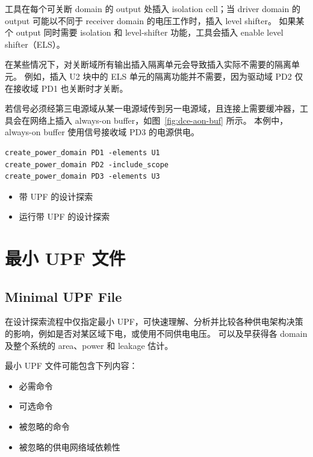 工具在每个可关断 domain 的 output 处插入 isolation cell；当 driver domain 的 output 可能以不同于 receiver domain 的电压工作时，插入 level shifter。
如果某个 output 同时需要 isolation 和 level-shifter 功能，工具会插入 enable level shifter（ELS）。

在某些情况下，对关断域所有输出插入隔离单元会导致插入实际不需要的隔离单元。
例如，插入 U2 块中的 ELS 单元的隔离功能并不需要，因为驱动域 PD2 仅在接收域 PD1 也关断时才关断。

若信号必须经第三电源域从某一电源域传到另一电源域，且连接上需要缓冲器，工具会在网络上插入 always-on buffer，如图~\ref{fig:dce-aon-buf} 所示。
本例中，always-on buffer 使用信号接收域 PD3 的电源供电。
\begin{lstlisting}
create_power_domain PD1 -elements U1
create_power_domain PD2 -include_scope
create_power_domain PD3 -elements U3
\end{lstlisting}


\begin{seeAlsoBox}
\begin{itemize}
  \item 带 UPF 的设计探索
  \item 运行带 UPF 的设计探索
\end{itemize}
\end{seeAlsoBox}

\section{最小 UPF 文件}
\subsection*{Minimal UPF File}

在设计探索流程中仅指定最小 UPF，可快速理解、分析并比较各种供电架构决策的影响，例如是否对某区域下电，或使用不同供电电压。
可以及早获得各 domain 及整个系统的 area、power 和 leakage 估计。

最小 UPF 文件可能包含下列内容：
\begin{itemize}
  \item 必需命令
  \item 可选命令
  \item 被忽略的命令
  \item 被忽略的供电网络域依赖性
\end{itemize}

